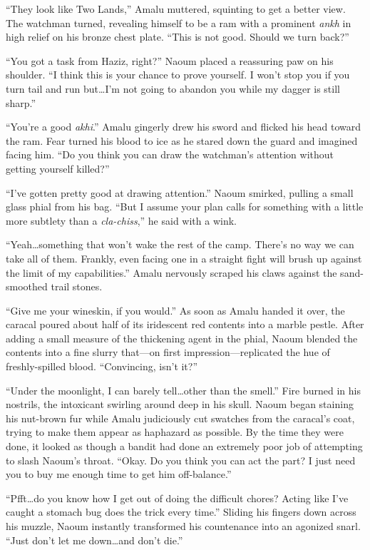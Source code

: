 ``They look like Two Lands,'' Amalu muttered, squinting to get a better view. The watchman turned, revealing himself to be a ram with a prominent \emph{ankh} in high relief on his bronze chest plate. ``This is not good. Should we turn back?''

``You got a task from Haziz, right?'' Naoum placed a reassuring paw on his shoulder. ``I think this is your chance to prove yourself. I won't stop you if you turn tail and run but\ldots{}I'm not going to abandon you while my dagger is still sharp.''

``You're a good \emph{akhi}.'' Amalu gingerly drew his sword and flicked his head toward the ram. Fear turned his blood to ice as he stared down the guard and imagined facing him. ``Do you think you can draw the watchman's attention without getting yourself killed?''

``I've gotten pretty good at drawing attention.'' Naoum smirked, pulling a small glass phial from his bag. ``But I assume your plan calls for something with a little more subtlety than a \emph{cla-chiss},'' he said with a wink.

``Yeah\ldots{}something that won't wake the rest of the camp. There's no way we can take all of them. Frankly, even facing one in a straight fight will brush up against the limit of my capabilities.'' Amalu nervously scraped his claws against the sand-smoothed trail stones.

``Give me your wineskin, if you would.'' As soon as Amalu handed it over, the caracal poured about half of its iridescent red contents into a marble pestle. After adding a small measure of the thickening agent in the phial, Naoum blended the contents into a fine slurry that---on first impression---replicated the hue of freshly-spilled blood. ``Convincing, isn't it?''

``Under the moonlight, I can barely tell\ldots{}other than the smell.'' Fire burned in his nostrils, the intoxicant swirling around deep in his skull. Naoum began staining his nut-brown fur while Amalu judiciously cut swatches from the caracal's coat, trying to make them appear as haphazard as possible. By the time they were done, it looked as though a bandit had done an extremely poor job of attempting to slash Naoum's throat. ``Okay. Do you think you can act the part? I just need you to buy me enough time to get him off-balance.''

``Pfft\ldots{}do you know how I get out of doing the difficult chores? Acting like I've caught a stomach bug does the trick every time.'' Sliding his fingers down across his muzzle, Naoum instantly transformed his countenance into an agonized snarl. ``Just don't let me down\ldots{}and don't die.''


